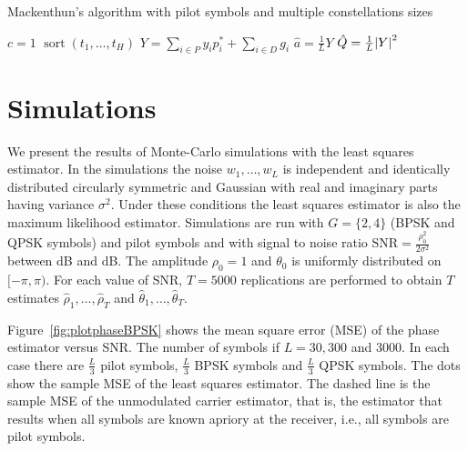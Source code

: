 \documentclass[journal]{IEEEtran}
\begin{document}
\begin{algorithm}[t] \label{alg:loglinear}
\SetAlCapFnt{\small}
\SetAlTitleFnt{}
\caption{Mackenthun's algorithm with pilot symbols and multiple constellations sizes}
\DontPrintSemicolon
{}
$c = 1$ \;
$\operatorname{sort}(t_1,\dots,t_H)$  \;
$Y = \sum_{i \in P} y_i p_i^* + \sum_{i \in D} g_i $ \;
$\hat{a} = \frac{1}{L} Y$ \;
$\hat{Q} = \frac{1}{L}{\left\vert Y \right\vert}^2$  \;
\end{algorithm}


\section{Simulations}\label{sec:simulations}

We present the results of Monte-Carlo simulations with the least squares estimator.  In the simulations the noise $w_1,\dots,w_L$ is independent and identically distributed circularly symmetric and Gaussian with real and imaginary parts having variance $\sigma^2$.  Under these conditions the least squares estimator is also the maximum likelihood estimator.  Simulations are run with $G = \{2,4\}$ (BPSK and QPSK symbols) and pilot symbols and with signal to noise ratio $\text{SNR} = \tfrac{\rho_0^2}{2\sigma^2}$ between \unit[-20]{dB} and \unit[20]{dB}.  The amplitude $\rho_0=1$ and $\theta_0$ is uniformly distributed on $[-\pi, \pi)$.  For each value of SNR, $T = 5000$ replications are performed to obtain $T$ estimates $\hat{\rho}_1, \dots, \hat{\rho}_T$ and $\hat{\theta}_1, \dots, \hat{\theta}_T$.

Figure~\ref{fig:plotphaseBPSK} shows the mean square error (MSE) of the phase estimator versus SNR.  The number of symbols if $L = 30, 300$ and $3000$.  In each case there are $\tfrac{L}{3}$ pilot symbols, $\tfrac{L}{3}$ BPSK symbols and $\tfrac{L}{3}$ QPSK symbols.  The dots show the sample MSE of the least squares estimator.  The dashed line is the sample MSE of the unmodulated carrier estimator, that is, the estimator that results when all symbols are known apriory at the receiver, i.e., all symbols are pilot symbols.
\end{document}
